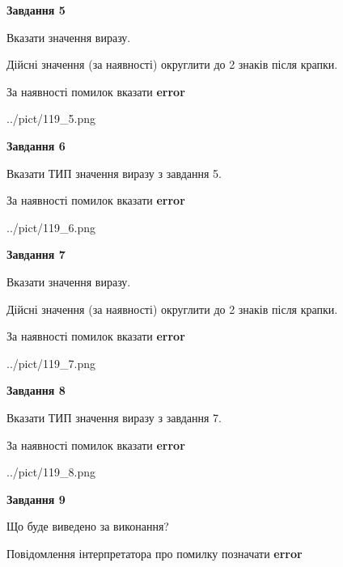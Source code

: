 \documentclass[11pt, ukrainian]{article}
\begin{document}
{\begin {large}
{\begin {center}\textbf{Завдання 5}\end {center}}\par
Вказати значення виразу. \par
Дійсні значення (за наявності) округлити до 2 знаків після крапки. \par
За наявності помилок вказати \textbf{error}

\begin{center}
	{../pict/119_5.png}
\end{center}
\newpage

{\begin {center}\textbf{Завдання 6}\end {center}}\par
Вказати ТИП значення виразу з завдання 5. \par
За наявності помилок вказати \textbf{error}

\begin{center}
	{../pict/119_6.png}
\end{center}
\newpage

{\begin {center}\textbf{Завдання 7}\end {center}}\par
Вказати значення виразу. \par
Дійсні значення (за наявності) округлити до 2 знаків після крапки. \par
За наявності помилок вказати \textbf{error}

\begin{center}
	{../pict/119_7.png}
\end{center}
\newpage

{\begin {center}\textbf{Завдання 8}\end {center}}\par
Вказати ТИП значення виразу з завдання 7. \par
За наявності помилок вказати \textbf{error}

\begin{center}
	{../pict/119_8.png}
\end{center}
\newpage

{\begin {center}\textbf{Завдання 9}\end {center}}\par
Що буде виведено за виконання? \par
Повідомлення інтерпретатора про помилку позначати \textbf{error}


\end{large}}
\end{document}
